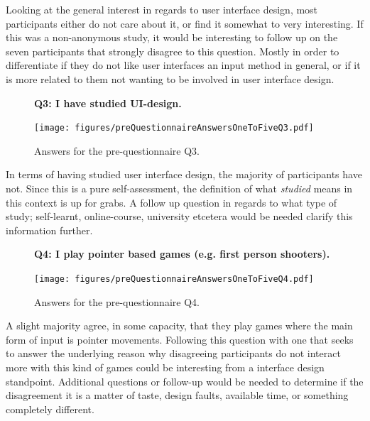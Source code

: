 \documentclass[nofilelist,dvipsnames]{cslthse-msc}
\begin{document}
        Looking at the general interest in regards to user interface design,
        most participants either do not care about it, or find it somewhat to
        very interesting. If this was a non-anonymous study, it would be
        interesting to follow up on the seven participants that strongly
        disagree to this question. Mostly in order to differentiate if they do
        not like user interfaces an input method in general, or if it is more
        related to them not wanting to be involved in user interface design.

				\begin{figure}[h!]
          \textbf{Q3: I have studied UI-design.}
          \begin{center}
            \texttt{[image: figures/preQuestionnaireAnswersOneToFiveQ3.pdf]}
            \vspace{-1cm}
            \caption{Answers for the pre-questionnaire Q3.}
          \end{center}
				\end{figure}

        In terms of having studied user interface design, the majority of
        participants have not. Since this is a pure self-assessment, the
        definition of what \textit{studied} means in this context is up for
        grabs. A follow up question in regards to what type of study;
        self-learnt, online-course, university etcetera would be needed clarify
        this information further.

				\begin{figure}[h!]
          \textbf{Q4: I play pointer based games (e.g. first person shooters).}
          \begin{center}
            \texttt{[image: figures/preQuestionnaireAnswersOneToFiveQ4.pdf]}
            \vspace{-1cm}
            \caption{Answers for the pre-questionnaire Q4.}
          \end{center}
				\end{figure}

        A slight majority agree, in some capacity, that they play games where
        the main form of input is pointer movements. Following this question
        with one that seeks to answer the underlying reason why disagreeing
        participants do not interact more with this kind of games could be
        interesting from a interface design standpoint. Additional questions or
        follow-up would be needed to determine if the disagreement it is a
        matter of taste, design faults, available time, or something completely
        different.
\end{document}

